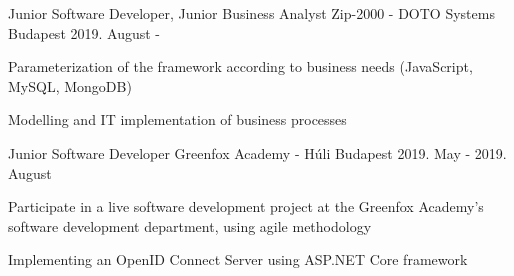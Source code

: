 

\begin{cventries}

  \cventry
    {Junior Software Developer, Junior Business Analyst} %
    {Zip-2000 - DOTO Systems} %
    {Budapest} %
    {2019. August - } %
    {
      \begin{cvitems} %
        \item {Parameterization of the framework according to business needs (JavaScript, MySQL, MongoDB)}
        \item {Modelling and IT implementation of business processes}
      \end{cvitems}
    }

  \cventry
    {Junior Software Developer} %
    {Greenfox Academy - Húli} %
    {Budapest} %
    {2019. May - 2019. August } %
    {
      \begin{cvitems} %
        \item {Participate in a live software development project at the Greenfox Academy's software development department, using agile methodology}
        \item {Implementing an OpenID Connect Server using ASP.NET Core framework}
      \end{cvitems}
    }  


\end{cventries}
